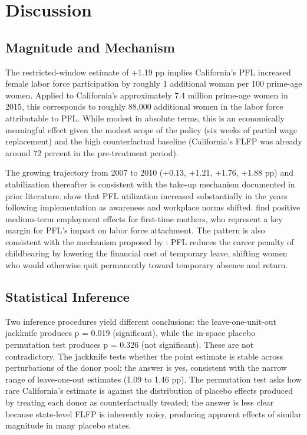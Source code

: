 \documentclass[12pt, letterpaper]{article}
\begin{document}
\section{Discussion}

\subsection{Magnitude and Mechanism}

The restricted-window estimate of +1.19 pp implies California's PFL increased female labor force participation by roughly 1 additional woman per 100 prime-age women. Applied to California's approximately 7.4 million prime-age women in 2015, this corresponds to roughly 88,000 additional women in the labor force attributable to PFL. While modest in absolute terms, this is an economically meaningful effect given the modest scope of the policy (six weeks of partial wage replacement) and the high counterfactual baseline (California's FLFP was already around 72 percent in the pre-treatment period).

The growing trajectory from 2007 to 2010 (+0.13, +1.21, +1.76, +1.88 pp) and stabilization thereafter is consistent with the take-up mechanism documented in prior literature. \citet{rossin2013} show that PFL utilization increased substantially in the years following implementation as awareness and workplace norms shifted. \citet{baum2016} find positive medium-term employment effects for first-time mothers, who represent a key margin for PFL's impact on labor force attachment. The pattern is also consistent with the mechanism proposed by \citet{klerman2013}: PFL reduces the career penalty of childbearing by lowering the financial cost of temporary leave, shifting women who would otherwise quit permanently toward temporary absence and return.

\subsection{Statistical Inference}

Two inference procedures yield different conclusions: the leave-one-unit-out jackknife produces p = 0.019 (significant), while the in-space placebo permutation test produces p = 0.326 (not significant). These are not contradictory. The jackknife tests whether the point estimate is stable across perturbations of the donor pool; the answer is yes, consistent with the narrow range of leave-one-out estimates (1.09 to 1.46 pp). The permutation test asks how rare California's estimate is against the distribution of placebo effects produced by treating each donor as counterfactually treated; the answer is less clear because state-level FLFP is inherently noisy, producing apparent effects of similar magnitude in many placebo states.
\end{document}
